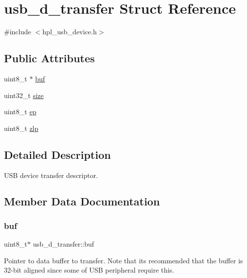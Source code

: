 \hypertarget{structusb__d__transfer}{}\section{usb\+\_\+d\+\_\+transfer Struct Reference}
\label{structusb__d__transfer}


{\ttfamily \#include $<$hpl\+\_\+usb\+\_\+device.\+h$>$}

\subsection*{Public Attributes}
\begin{DoxyCompactItemize}
\item 
uint8\+\_\+t $\ast$ \hyperlink{structusb__d__transfer_a979de0737e5f05d36cdfb7d7327be5c7}{buf}
\item 
uint32\+\_\+t \hyperlink{structusb__d__transfer_ac7676f6907606ecd6eba03d6b0e2b915}{size}
\item 
uint8\+\_\+t \hyperlink{structusb__d__transfer_ad53893b4d9d4e69ed95640f8968469b3}{ep}
\item 
uint8\+\_\+t \hyperlink{structusb__d__transfer_aa81844ece1f714100179ae8ff16d0f44}{zlp}
\end{DoxyCompactItemize}


\subsection{Detailed Description}
U\+SB device transfer descriptor. 

\subsection{Member Data Documentation}
\mbox{\label{structusb__d__transfer_a979de0737e5f05d36cdfb7d7327be5c7}} 
\subsubsection{\texorpdfstring{buf}{buf}}
{\footnotesize\ttfamily uint8\+\_\+t$\ast$ usb\+\_\+d\+\_\+transfer\+::buf}

Pointer to data buffer to transfer. Note that it\textquotesingle{}s recommended that the buffer is 32-\/bit aligned since some of U\+SB peripheral require this. \mbox{\label{structusb__d__transfer_ad53893b4d9d4e69ed95640f8968469b3}} 
